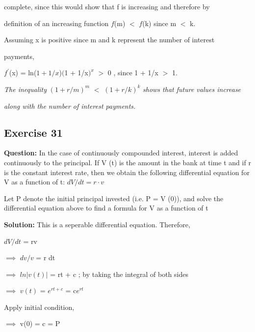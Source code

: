 \documentclass{article}
\begin{document}
complete, since this would show that f is increasing and therefore by 

definition of an increasing function $f$(m) $<$ $f$(k) since m $<$ k.

\vspace{\baselineskip}

Assuming x is positive since m and k represent the number of interest 

payments,

\vspace{\baselineskip}

$f^\prime$(x) = ln($1 + 1/x$)$($1 + 1/x$) ^ x$  $>$ 0 , since 1 + 1/x $>$  1.

\vspace{\baselineskip}

\textit{The inequality} $(1 + r/m) ^ m$ $<$ $(1 + r/k)^k$ \textit{shows that future values increase }

\textit{along with the number of interest payments. } 

\subsection*{Exercise 31}

\textbf{Question:} In the case of continuously compounded interest, interest is
added continuously to the principal. If V (t) is the amount in the bank at time t and if r is the constant interest
rate, then we obtain the following differential equation for V as a function of t: $dV/dt = r \cdot v$

\vspace{\baselineskip}

\noindent Let P denote the initial principal invested (i.e. P = V (0)), and solve the differential equation above to find a
formula for V as a function of t

\textbf{Solution:}
This is a seperable differential equation. Therefore,

\hspace{0.9cm}$dV/dt$ = rv

$\implies$ $dv/v$ = r dt 

$\implies$ $ln|v(t)|$ = rt + c ; by taking the integral of both sides

$\implies$ $v(t)$ = $e^{rt + c}$ = c$e^{rt}$

\vspace{\baselineskip}

Apply initial condition,

$\implies$ v(0) = c = P
\end{document}
